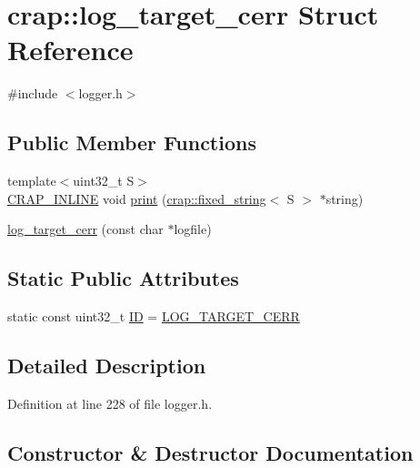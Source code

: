 \hypertarget{structcrap_1_1log__target__cerr}{}\section{crap\+:\+:log\+\_\+target\+\_\+cerr Struct Reference}
\label{structcrap_1_1log__target__cerr}


{\ttfamily \#include $<$logger.\+h$>$}

\subsection*{Public Member Functions}
\begin{DoxyCompactItemize}
\item 
{\footnotesize template$<$uint32\+\_\+t S$>$ }\\\hyperlink{config__x86_8h_a5a40526b8d842e7ff731509998bb0f1c}{C\+R\+A\+P\+\_\+\+I\+N\+L\+I\+N\+E} void \hyperlink{structcrap_1_1log__target__cerr_abcfeb7020d79a180c659c0dbb0948e0f}{print} (\hyperlink{classcrap_1_1fixed__string}{crap\+::fixed\+\_\+string}$<$ S $>$ $\ast$string)
\item 
\hyperlink{structcrap_1_1log__target__cerr_a6d9eed4a0f329d9e46a17e293ef6e785}{log\+\_\+target\+\_\+cerr} (const char $\ast$logfile)
\end{DoxyCompactItemize}
\subsection*{Static Public Attributes}
\begin{DoxyCompactItemize}
\item 
static const uint32\+\_\+t \hyperlink{structcrap_1_1log__target__cerr_a33b6b749a34b045309cd086d81fa672a}{I\+D} = \hyperlink{logger_8h_a6d43164e0467f6d395fa0e0773535439}{L\+O\+G\+\_\+\+T\+A\+R\+G\+E\+T\+\_\+\+C\+E\+R\+R}
\end{DoxyCompactItemize}


\subsection{Detailed Description}


Definition at line 228 of file logger.\+h.



\subsection{Constructor \& Destructor Documentation}
\hypertarget{structcrap_1_1log__target__cerr_a6d9eed4a0f329d9e46a17e293ef6e785}{}
